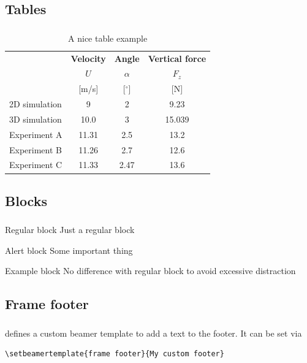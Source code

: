 \subsection{Tables}
\begin{frame}
  \frametitle{\insertsectionhead}
  \framesubtitle{\insertsubsectionhead}
  \begin{table}[H]
    \centering
    \caption{A nice table example}
    \begin{tabular}{@{} lccc @{}}
      \toprule
      & \textbf{Velocity} & \textbf{Angle}  & \textbf{Vertical force} \\
      & $U$ & $\alpha$  & $F_z$ \\
      & [m/s] & [$^\circ$]  & [N] \\
      \midrule
      2D simulation  & 9 & 2 & 9.23 \\
      3D simulation  & 10.0 & 3 & 15.039 \\
      Experiment A   & 11.31 & 2.5 & 13.2 \\
      Experiment B   & 11.26 & 2.7 & 12.6 \\
      Experiment C   & 11.33 & 2.47 & 13.6 \\
      \bottomrule
    \end{tabular}
  \end{table}

\end{frame}

\subsection{Blocks}
\begin{frame}
  \frametitle{\insertsectionhead}
  \framesubtitle{\insertsubsectionhead}
  \begin{block}{Regular block}
    Just a regular block
  \end{block}
  \begin{alertblock}{Alert block}
    Some important thing
  \end{alertblock}
  \begin{exampleblock}{Example block}
    No difference with regular block to avoid excessive distraction
  \end{exampleblock}
\end{frame}

\subsection{Frame footer}
{
\begin{frame}[fragile]
  \frametitle{\insertsectionhead}
  \framesubtitle{\insertsubsectionhead}
    \themename defines a custom beamer template to add a text to the footer. It can be set via
    \begin{verbatim}\setbeamertemplate{frame footer}{My custom footer}\end{verbatim}
\end{frame}
}

